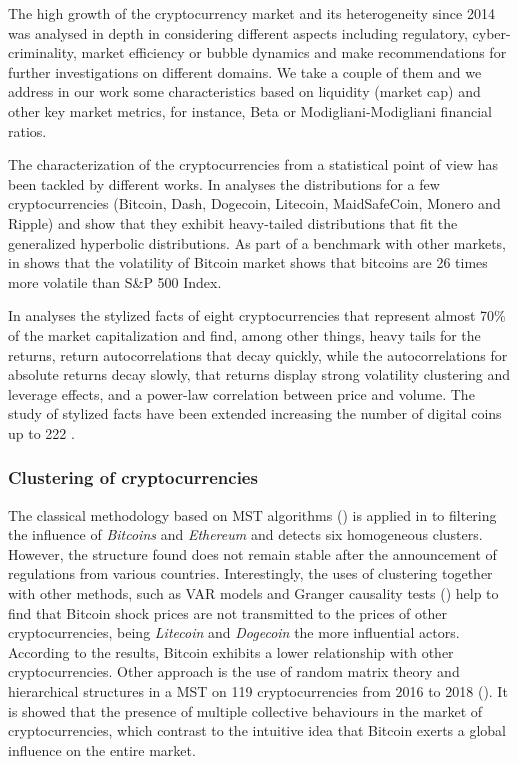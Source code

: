 \documentclass{bmcart}
\begin{document}
The high growth of the cryptocurrency market and its heterogeneity since 2014 was analysed in depth in \cite{SystematicAnalysisCrypto2018} considering different aspects including regulatory, cyber-criminality, market efficiency or bubble dynamics and make recommendations for further investigations on different domains. We take a couple of them and we address in our work some characteristics based on liquidity (market cap) and other key market metrics, for instance, Beta or Modigliani-Modigliani  financial ratios. 


The characterization of the cryptocurrencies from a statistical point of view has been tackled by different works. In \cite{StatisticalAnalysisOfCryptoc} analyses the distributions for a few cryptocurrencies (Bitcoin, Dash, Dogecoin, Litecoin, MaidSafeCoin, Monero and Ripple) and show that they exhibit heavy-tailed distributions  that fit the generalized hyperbolic distributions. As part of a benchmark with other markets, in \cite{baek2015bitcoins} shows that the volatility of Bitcoin market shows that bitcoins are 26 times more volatile than S\&P 500 Index.  

In \cite{Zhang2018SomeSF} analyses the stylized facts of eight cryptocurrencies that represent almost 70\% of the market capitalization and find, among other things, heavy tails for the returns, return autocorrelations that decay quickly, while the autocorrelations for absolute returns decay slowly, that returns display strong volatility clustering and leverage effects, and a power-law correlation between price and volume. The study of stylized facts have been extended  increasing  the number of digital coins up to 222 \cite{Hu2018CryptocurrenciesSF}.


\subsubsection*{Clustering of cryptocurrencies}

The classical methodology based on MST algorithms (\cite{HierarchicalStructureFinancialMK1999}) is applied in \cite{Song2019} to filtering the influence of \textit{Bitcoins} and \textit{Ethereum} and detects six homogeneous clusters. However, the structure found does not remain stable after the announcement of regulations from various countries. Interestingly, the  uses of clustering together with other methods, such as VAR models and Granger causality tests (\cite{ShockTransmissionCryptoMK2019}) help to find that Bitcoin shock prices are not transmitted to the prices of other cryptocurrencies, being \textit{Litecoin} and \textit{Dogecoin} the more influential actors. According to the results, Bitcoin exhibits a lower relationship with other cryptocurrencies. Other approach is the use of random matrix theory and hierarchical structures in a MST on 119 cryptocurrencies from 2016 to 2018 (\cite{Stosic2018CollectiveBO}). It is showed that the  presence of multiple collective behaviours in the market of cryptocurrencies, which contrast to the intuitive idea that Bitcoin exerts a global influence on the entire market.
\end{document}
